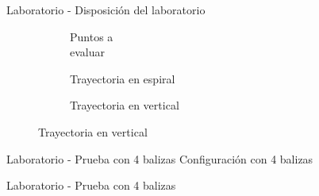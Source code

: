 \documentclass{beamer}
\begin{document}
  \begin{frame}{Laboratorio - Disposición del laboratorio}
    \begin{figure}[H]
      \begin{subfigure}[b]{.3\textwidth}
        \centering
        \def\svgwidth{0.85\linewidth}
         
        \caption{Puntos a \\evaluar}
        \label{fig:puntos}
      \end{subfigure}
      \begin{subfigure}[b]{.3\textwidth}
        \centering
        \def\svgwidth{0.85\linewidth}
         
        \caption{Trayectoria en espiral}
        \label{fig:espiral}
      \end{subfigure}
      \begin{subfigure}[b]{.3\textwidth}
          \centering
          \def\svgwidth{0.85\linewidth}
         
          \caption{Trayectoria en vertical}
          \label{fig:vertical}
        \end{subfigure}
      \label{fig:laboratorio}
      \end{figure}
  \end{frame}

  \begin{frame}{Laboratorio - Prueba con 4 balizas}
    Configuración con 4 balizas
    \begin{figure}[H]
      \centering
      \def\svgwidth{0.4\linewidth}
       
      \label{fig:lab_4sens}
    \end{figure}
  \end{frame}

  \begin{frame}{Laboratorio - Prueba con 4 balizas}
    \begin{figure}[H]
      \centering
      \scalebox{0.6}{}
      \label{fig:res_4_lab}
  \end{figure}
  \end{frame}
  
\end{document}
